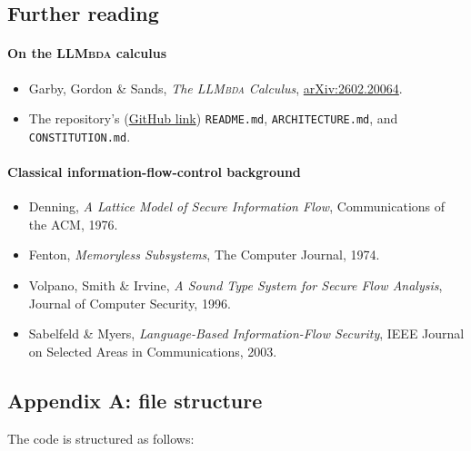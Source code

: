 \documentclass[11pt, a4paper]{article}
\newcommand{\LLMbda}{\textsc{LLMbda}\xspace}
\begin{document}
\subsection{Further reading}

\paragraph{On the \LLMbda calculus}

\begin{itemize}
  \item Garby, Gordon \& Sands, \emph{The \LLMbda Calculus},
    \href{https://arxiv.org/abs/2602.20064}{arXiv:2602.20064}.
  \item The repository's (\href{https://github.com/schlpbch/LLMbdaJS}{GitHub link}) \texttt{README.md}, \texttt{ARCHITECTURE.md},
    and \texttt{CONSTITUTION.md}.
\end{itemize}

\paragraph{Classical information-flow-control background}
\begin{itemize}
  \item Denning, \emph{A Lattice Model of Secure Information Flow},
    Communications of the ACM, 1976.
  \item Fenton, \emph{Memoryless Subsystems}, The Computer Journal, 1974.
  \item Volpano, Smith \& Irvine, \emph{A Sound Type System for Secure
    Flow Analysis}, Journal of Computer Security, 1996.
  \item Sabelfeld \& Myers, \emph{Language-Based Information-Flow
    Security}, IEEE Journal on Selected Areas in Communications, 2003.
\end{itemize}

\subsection{Appendix A: file structure}

The code is structured as follows:
\end{document}
